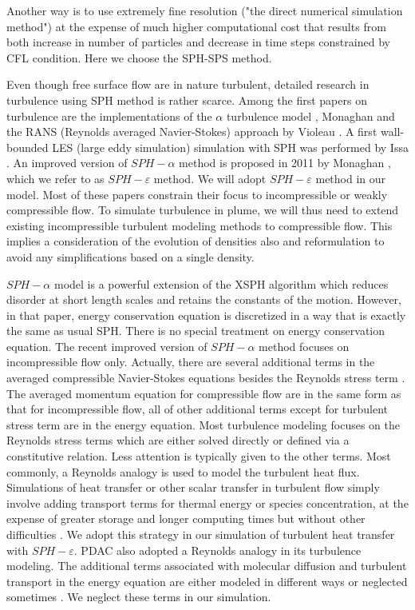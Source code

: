 \documentclass[journal abbreviation, manuscript]{copernicus}
\begin{document}
Another way is to use extremely fine resolution ("the direct numerical simulation method") at the expense of much higher computational cost that results from both increase in number of particles and decrease in time steps constrained by CFL condition. Here we choose the SPH-SPS method.

Even though free surface flow are in nature turbulent, detailed research in turbulence using SPH method is rather scarce. Among the first papers on turbulence are the implementations of the $\alpha$ turbulence model \citep{holm1999fluctuation}, Monaghan \citep{monaghan2002sph} and the RANS (Reynolds averaged Navier-Stokes) approach by Violeau \citep{violeau2007numerical}. A first wall-bounded LES (large eddy simulation) simulation with SPH was performed by Issa \citep{issa2005numerical}. An improved version of $SPH-\alpha$ method is proposed in 2011 by Monaghan \citep{monaghan2011turbulence}, which we refer to as $SPH-\varepsilon$ method. We will adopt $SPH-\varepsilon$ method in our model. Most of these papers constrain their focus to incompressible or weakly compressible flow. To simulate turbulence in plume, we will thus need to extend existing incompressible turbulent modeling methods to compressible flow. This implies a consideration of the evolution of densities also and reformulation to avoid any simplifications based on a single density.


$SPH-\alpha$ model \citep{monaghan2002sph} is a powerful extension of the XSPH algorithm which reduces disorder at short length scales and retains the constants of the motion. However, in that paper, energy conservation equation is discretized in a way that is exactly the same as usual SPH. There is no special treatment on energy conservation equation. The recent improved version \citep{monaghan2011turbulence} of $SPH-\alpha$ method focuses on incompressible flow only. Actually, there are several additional terms in the averaged compressible Navier-Stokes equations besides the Reynolds stress term \citep{NASACompressibleTurbulence}. The averaged momentum equation for compressible flow are in the same form as that for incompressible flow, all of other additional terms except for turbulent stress term are in the energy equation. Most turbulence modeling focuses on the Reynolds stress terms which are either solved directly or defined via a constitutive relation. Less attention is typically given to the other terms. Most commonly, a Reynolds analogy is used to model the turbulent heat flux. Simulations of heat transfer or other scalar transfer in turbulent flow simply involve adding transport terms for thermal energy or species concentration, at the expense of greater storage and longer computing times but without other difficulties \citep{cebeci2013analysis}. We adopt this strategy in our simulation of turbulent heat transfer with $SPH-\varepsilon$. PDAC \citep{neri2003multiparticle} also adopted a Reynolds analogy in its turbulence modeling. The additional terms associated with molecular diffusion and turbulent transport in the energy equation are either modeled in different ways or neglected sometimes \citep{NASACompressibleTurbulence}. We neglect these terms in our simulation.
\end{document}

